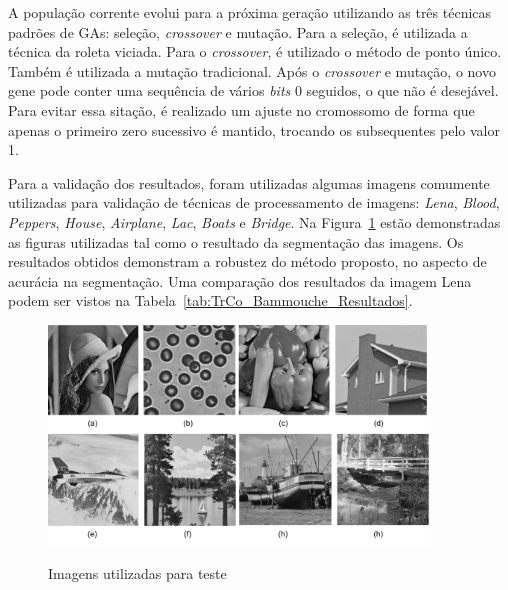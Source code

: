 \documentclass[12pt,oneside,a4paper,english,french,spanish,brazil,]{abntex2}
\begin{document}
A população corrente evolui para a próxima geração utilizando as três técnicas padrões de GAs: seleção, \textit{crossover} e mutação. Para a seleção, é utilizada a técnica da roleta viciada. Para o \textit{crossover}, é utilizado o método de ponto único. Também é utilizada a mutação tradicional. Após o \textit{crossover} e mutação, o novo gene pode conter uma sequência de vários \textit{bits} 0 seguidos, o que não é desejável. Para evitar essa sitação, é realizado um ajuste no cromossomo de forma que apenas o primeiro zero sucessivo é mantido, trocando os subsequentes pelo valor 1.

Para a validação dos resultados, foram utilizadas algumas imagens comumente utilizadas para validação de técnicas de processamento de imagens: \textit{Lena}, \textit{Blood}, \textit{Peppers}, \textit{House}, \textit{Airplane}, \textit{Lac}, \textit{Boats} e \textit{Bridge}. Na Figura~\ref{fig:TrCo_Hammouche_1} estão demonstradas as figuras utilizadas tal como o resultado da segmentação das imagens. Os resultados obtidos demonstram a robustez do método proposto, no aspecto de acurácia na segmentação. Uma comparação dos resultados da imagem Lena podem ser vistos na Tabela~\ref{tab:TrCo_Bammouche_Resultados}.

\begin{figure}[ht]
\centering
\caption{Imagens utilizadas para teste}
\includegraphics[width=0.9\textwidth]{imagens/TrCo_Hammouche_1.pdf}
\label{fig:TrCo_Hammouche_1}
\end{figure}
\end{document}

